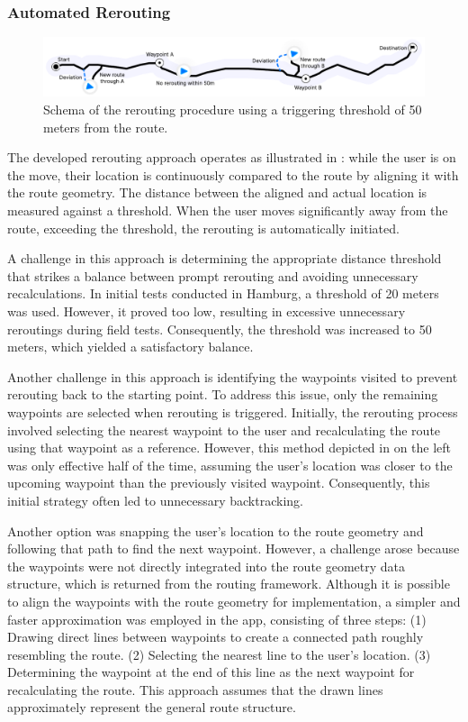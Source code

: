 \subsubsection{Automated Rerouting}

\begin{figure}[t]
\centering
\includegraphics[width=\linewidth]{images/rerouting-strategy.pdf}
\caption{Schema of the rerouting procedure using a triggering threshold of 50 meters from the route.}
\label{fig:rerouting-strategy}
\end{figure}

The developed rerouting approach operates as illustrated in : while the user is on the move, their location is continuously compared to the route by aligning it with the route geometry. The distance between the aligned and actual location is measured against a threshold. When the user moves significantly away from the route, exceeding the threshold, the rerouting is automatically initiated. 

A challenge in this approach is determining the appropriate distance threshold that strikes a balance between prompt rerouting and avoiding unnecessary recalculations. In initial tests conducted in Hamburg, a threshold of 20 meters was used. However, it proved too low, resulting in excessive unnecessary reroutings during field tests. Consequently, the threshold was increased to 50 meters, which yielded a satisfactory balance.

Another challenge in this approach is identifying the waypoints visited to prevent rerouting back to the starting point. To address this issue, only the remaining waypoints are selected when rerouting is triggered. Initially, the rerouting process involved selecting the nearest waypoint to the user and recalculating the route using that waypoint as a reference. However, this method depicted in  on the left was only effective half of the time, assuming the user's location was closer to the upcoming waypoint than the previously visited waypoint. Consequently, this initial strategy often led to unnecessary backtracking.

Another option was snapping the user's location to the route geometry and following that path to find the next waypoint. However, a challenge arose because the waypoints were not directly integrated into the route geometry data structure, which is returned from the routing framework. Although it is possible to align the waypoints with the route geometry for implementation, a simpler and faster approximation was employed in the app, consisting of three steps: (1) Drawing direct lines between waypoints to create a connected path roughly resembling the route. (2) Selecting the nearest line to the user's location. (3) Determining the waypoint at the end of this line as the next waypoint for recalculating the route. This approach assumes that the drawn lines approximately represent the general route structure.

